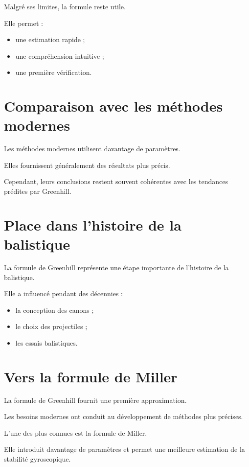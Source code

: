 Malgré ses limites, la formule reste utile.

Elle permet :

\begin{itemize}
    \item une estimation rapide ;
    \item une compréhension intuitive ;
    \item une première vérification.
\end{itemize}

\section{Comparaison avec les méthodes modernes}

Les méthodes modernes utilisent davantage de paramètres.

Elles fournissent généralement des résultats plus précis.

Cependant, leurs conclusions restent souvent cohérentes avec les tendances
prédites par Greenhill.

\section{Place dans l'histoire de la balistique}

La formule de Greenhill représente une étape importante de l'histoire de la
balistique.

Elle a influencé pendant des décennies :

\begin{itemize}
    \item la conception des canons ;
    \item le choix des projectiles ;
    \item les essais balistiques.
\end{itemize}

\section{Vers la formule de Miller}

La formule de Greenhill fournit une première approximation.

Les besoins modernes ont conduit au développement de méthodes plus précises.

L'une des plus connues est la formule de Miller.

Elle introduit davantage de paramètres et permet une meilleure estimation de
la stabilité gyroscopique.

